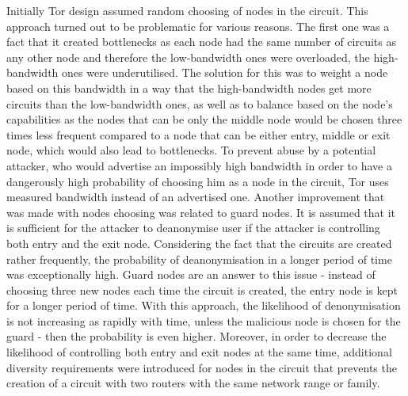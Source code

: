 Initially Tor design assumed random choosing of nodes in the circuit. This approach turned out to be problematic for various reasons. The first one was a fact that it created bottlenecks as each node had the same number of circuits as any other node and therefore the low-bandwidth ones were overloaded, the high-bandwidth ones were underutilised. The solution for this was to weight a node based on this bandwidth in a way that the high-bandwidth nodes get more circuits than the low-bandwidth ones, as well as to balance based on the node’s capabilities as the nodes that can be only the middle node would be chosen three times less frequent compared to a node that can be either entry, middle or exit node, which would also lead to bottlenecks. To prevent abuse by a potential attacker, who would advertise an impossibly high bandwidth in order to have a dangerously high probability of choosing him as a node in the circuit, Tor uses measured bandwidth instead of an advertised one. Another improvement that was made with nodes choosing was related to guard nodes. It is assumed that it is sufficient for the attacker to deanonymise user if the attacker is controlling both entry and the exit node. Considering the fact that the circuits are created rather frequently, the probability of deanonymisation in a longer period of time was exceptionally high. Guard nodes are an answer to this issue - instead of choosing three new nodes each time the circuit is created, the entry node is kept for a longer period of time. With this approach, the likelihood of denonymisation is not increasing as rapidly with time, unless the malicious node is chosen for the guard - then the probability is even higher. Moreover, in order to decrease the likelihood of controlling both entry and exit nodes at the same time, additional diversity requirements were introduced for nodes in the circuit that prevents the creation of a circuit with two routers with the same network range or family.

